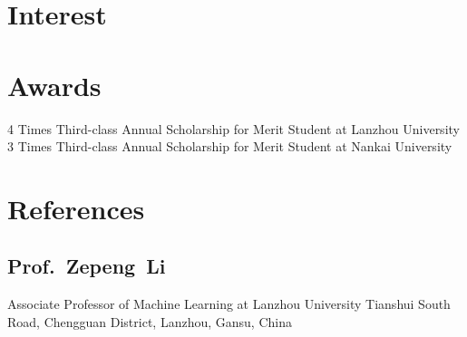 \documentclass[11pt,a4paper, final]{moderncv}
\newcommand{\spacesection}{\vspace{0.4cm}}
\newcommand{\spacesubsection}{\vspace{0.2cm}}
\begin{document}
\section{\textbf{Interest}}
\section{\textbf{Awards}}
		{4 Times Third-class Annual Scholarship for Merit Student at Lanzhou University}
		{3 Times Third-class Annual Scholarship for Merit Student at Nankai University}
\section{\textbf{References}}
	\spacesubsection
	\subsection{\textbf{Prof.~Zepeng~Li}}
		\cvline{}
		{Associate Professor of Machine Learning at Lanzhou University}
		{Tianshui South Road, Chengguan District, Lanzhou, Gansu, China}
	\spacesubsection
\end{document}
